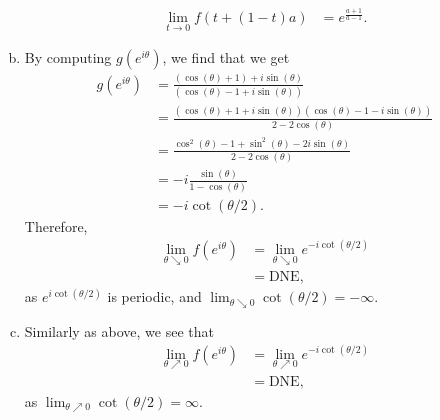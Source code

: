 \documentclass[10pt]{mypackage}
\begin{document}
\begin{solution}
\begin{enumerate}[(a)]
\begin{align*}
        \lim_{t\rightarrow 0} f\left( t + \left( 1-t \right)a \right) &= e^{\frac{a+1}{a-1}}.
      \end{align*}
    \item By computing $g\left( e^{i\theta} \right)$, we find that we get
      \begin{align*}
        g\left( e^{i\theta} \right) &= \frac{\left( \cos\left( \theta \right) + 1 \right) + i\sin\left( \theta \right)}{ \left( \cos\left( \theta \right)-1 + i\sin\left( \theta \right) \right)}\\
                                    &= \frac{\left( \cos\left( \theta \right)+1 + i\sin\left( \theta \right) \right)\left( \cos\left( \theta \right)-1 - i\sin\left( \theta \right) \right)}{2-2\cos\left( \theta \right)}\\
                                    &= \frac{\cos^2\left( \theta \right) - 1 + \sin^2\left( \theta \right) - 2i\sin\left( \theta \right)}{2-2\cos\left( \theta \right)}\\
                                    &= -i\frac{\sin\left( \theta \right)}{1-\cos\left( \theta \right)}\\
                                    &= -i\cot\left( \theta/2 \right).
      \end{align*}
      Therefore, 
      \begin{align*}
        \lim_{\theta \searrow 0} f\left( e^{i\theta} \right) &= \lim_{\theta \searrow 0} e^{-i\cot\left( \theta/2 \right)}\\
                                                             &= \text{DNE},
      \end{align*}
      as $e^{i\cot\left( \theta/2 \right)}$ is periodic, and $\lim_{\theta\searrow 0} \cot\left( \theta/2 \right) = -\infty$.
    \item Similarly as above, we see that
      \begin{align*}
        \lim_{\theta\nearrow 0} f\left( e^{i\theta} \right) &= \lim_{\theta \nearrow 0} e^{-i\cot\left( \theta/2 \right)}\\
                                                            &= \text{DNE},
      \end{align*}
      as $\lim_{\theta\nearrow 0}\cot\left( \theta/2 \right) = \infty$.
  \end{enumerate}
\end{solution}
\end{document}
